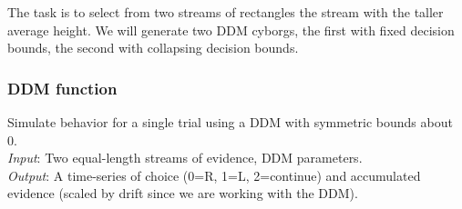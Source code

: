 \documentclass[
]{book}
\begin{document}
The task is to select from two streams of rectangles the stream with the taller average height. We will generate two DDM cyborgs, the first with fixed decision bounds, the second with collapsing decision bounds.

\hypertarget{ddm-function}{%
\subsubsection*{DDM function}\label{ddm-function}}

Simulate behavior for a single trial using a DDM with symmetric bounds about 0.\\
\emph{Input}: Two equal-length streams of evidence, DDM parameters.\\
\emph{Output}: A time-series of choice (0=R, 1=L, 2=continue) and accumulated evidence (scaled by drift since we are working with the DDM).
\end{document}
